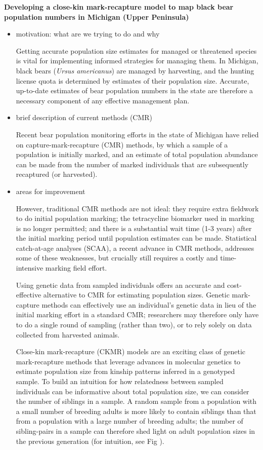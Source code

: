 \documentclass[12pt]{article}
\newcommand{\gb}[1]{{\color{blue}{#1}}}
\begin{document}
%
\begin{center}
\textbf{Developing a close-kin mark-recapture model to map black bear population numbers in Michigan (Upper Peninsula)}
\end{center}
%            
\begin{itemize}
\item motivation: what are we trying to do and why

Getting accurate population size estimates 
for managed or threatened species  
is vital for implementing informed strategies for managing them.
In Michigan, black bears (\textit{Ursus americanus}) 
are managed by harvesting, 
and the hunting license quota is determined by 
estimates of their population size.
Accurate, up-to-date estimates of 
bear population numbers in the state 
are therefore a necessary component 
of any effective management plan.

\item brief description of current methods (CMR)

Recent bear population monitoring efforts 
in the state of Michigan have relied on 
capture-mark-recapture (CMR) methods, 
by which a sample of a population is initially marked, 
and an estimate of total population abundance 
can be made from the number of marked individuals 
that are subsequently recaptured (or harvested). 

\item areas for improvement

However, traditional CMR methods are not ideal:  
they require extra fieldwork to do initial population marking; 
the tetracycline biomarker used in marking is no longer permitted; 
and there is a substantial wait time (1-3 years) after the 
initial marking period until population estimates can be made.
Statistical catch-at-age analyses (SCAA), 
a recent advance in CMR methods, 
addresses some of these weaknesses, 
but crucially still requires a costly and time-intensive 
marking field effort.

Using genetic data from sampled individuals 
offers an accurate and cost-effective alternative to CMR 
for estimating population sizes. 
Genetic mark-capture methods can effectively use 
an individual's genetic data in lieu of 
the initial marking effort in a standard CMR; 
researchers may therefore 
only have to do a single round of sampling 
(rather than two), 
or to rely solely on data collected from harvested animals.

Close-kin mark-recapture (CKMR) models 
are an exciting class of genetic mark-recapture methods 
that leverage advances in molecular genetics 
to estimate population size 
from kinship patterns inferred in a genotyped sample.
To build an intuition for how relatedness 
between sampled individuals can be informative 
about total population size, 
we can consider the number of siblings in a sample.
A random sample from a population 
with a small number of breeding adults 
is more likely to contain siblings than that 
from a population with a large number of breeding adults; 
the number of sibling-pairs in a sample can 
therefore shed light on adult population sizes 
in the previous generation 
(for intuition, see Fig \gb{XXX}).


\end{itemize}
\end{document}
